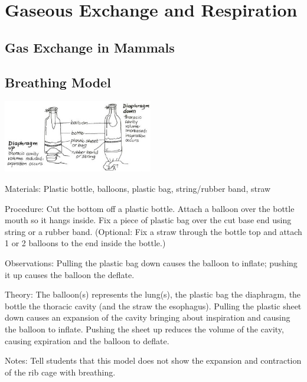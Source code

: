 \section{Gaseous Exchange and Respiration}

\begin{multicols}{2}


\section*{Gas Exchange in Mammals}


\subsection{Breathing Model} %

\begin{center}
\includegraphics[width=0.49\textwidth]{./img/vso/breathing-model.jpg}
\end{center}

\begin{description*}
\item[Materials:]{Plastic bottle, balloons, plastic bag, string/rubber band, straw}
\item[Procedure:]{Cut the bottom off a plastic
bottle. Attach a balloon over the
bottle mouth so it hangs inside.
Fix a piece of plastic bag over the
cut base end using string or a rubber band. (Optional: Fix a straw through the bottle top and attach 1 or 2 balloons to the end inside the bottle.)}
\item[Observations:]{Pulling the plastic bag down causes the balloon to inflate; pushing it up causes the balloon the deflate.}
\item[Theory:]{The balloon(s) represents the lung(s), the plastic bag the diaphragm, the bottle the thoracic cavity (and the straw the esophagus). Pulling the plastic sheet down causes an expansion of the cavity bringing about inspiration and causing the balloon to inflate. Pushing the sheet up reduces the volume of the cavity, causing expiration and the balloon to deflate.}
\item[Notes:]{Tell students that this model does not show the expansion and contraction of the rib cage with breathing.}
\end{description*}


\end{multicols}
